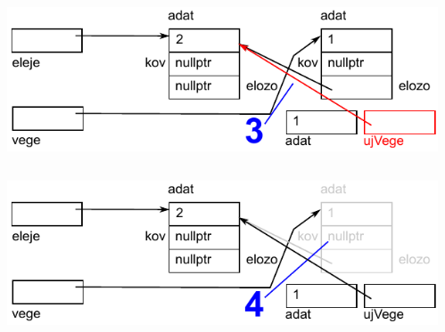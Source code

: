 \begin{frame}
  \begin{columns}[c]
      \scriptsize
      \begin{exampleblock}{}
        \scriptsize
        
      \end{exampleblock}
      \includegraphics[width=\textwidth]{sor/sor22.pdf}
  \end{columns}
\end{frame}

\begin{frame}
  \begin{columns}[c]
      \scriptsize
      \begin{exampleblock}{}
        \scriptsize
        
      \end{exampleblock}
      \includegraphics[width=\textwidth]{sor/sor23.pdf}
  \end{columns}
\end{frame}

